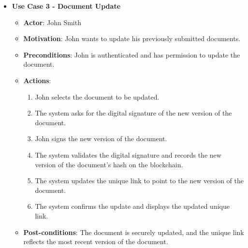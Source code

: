 \documentclass[a4paper,11pt]{article}
\begin{document}
\begin{itemize}
                    \item \textbf{Use Case 3 - Document Update}
                    \begin{itemize}
                        \item \textbf{Actor}: John Smith
                        \item \textbf{Motivation}: John wants to update his previously submitted documents.
                        \item \textbf{Preconditions}: John is authenticated and has permission to update the document.
                        \item \textbf{Actions}:
                        \begin{enumerate}
                            \item John selects the document to be updated.
                            \item The system asks for the digital signature of the new version of the document.
                            \item John signs the new version of the document.
                            \item The system validates the digital signature and records the new version of the document's hash on the blockchain.
                            \item The system updates the unique link to point to the new version of the document.
                            \item The system confirms the update and displays the updated unique link.
                        \end{enumerate}
                        \item \textbf{Post-conditions}: The document is securely updated, and the unique link reflects the most recent version of the document.
                    \end{itemize}


\end{itemize}
\end{document}
